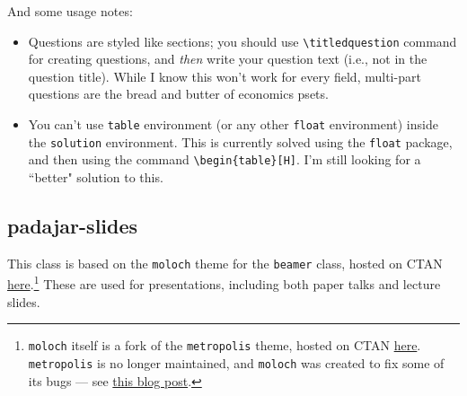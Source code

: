 \documentclass[11pt]{padajar-memo}
\newcommand{\ttslash}[1]{\texttt{\textbackslash #1}}
\begin{document}
And some usage notes:

\begin{itemize}
	\item Questions are styled like sections; you should use \ttslash{titledquestion} command for creating questions, and \textit{then} write your question text (i.e., not in the question title). While I know this won't work for every field, multi-part questions are the bread and butter of economics psets.
	\item You can't use \texttt{table} environment (or any other \texttt{float} environment) inside the \texttt{solution} environment. This is currently solved using the \texttt{float} package, and then using the command \ttslash{begin\{table\}[H]}. I'm still looking for a ``better" solution to this.
\end{itemize}

\subsection{padajar-slides}
This class is based on the \texttt{moloch} theme for the \texttt{beamer} class, hosted on CTAN \href{https://ctan.org/pkg/moloch}{here}.\footnote{\texttt{moloch} itself is a fork of the \texttt{metropolis} theme, hosted on CTAN \href{https://ctan.org/pkg/beamertheme-metropolis}{here}. \texttt{metropolis} is no longer maintained, and \texttt{moloch} was created to fix some of its bugs --- see \href{https://jolars.co/blog/2024-05-30-moloch/}{this blog post}.} These are used for presentations, including both paper talks and lecture slides.
\end{document}
